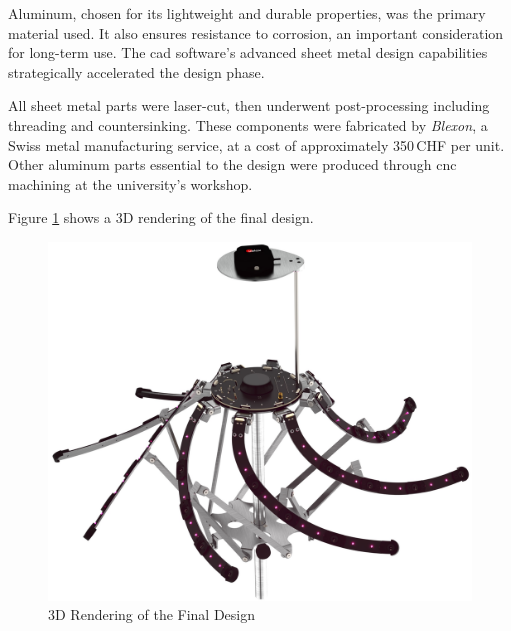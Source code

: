 Aluminum, chosen for its lightweight and durable properties, was the primary material used.
It also ensures resistance to corrosion, an important consideration for long-term use.
The \acrshort{cad} software's advanced sheet metal design capabilities strategically accelerated the design phase.

All sheet metal parts were laser-cut, then underwent post-processing including threading and countersinking.
These components were fabricated by \textit{Blexon}, a Swiss metal manufacturing service, at a cost of approximately 350\,CHF per unit.
Other aluminum parts essential to the design were produced through \acrshort{cnc} machining at the university's workshop.

Figure \ref{fig:final_design_3d_rendering} shows a 3D rendering of the final design.
\begin{figure}[h!]
	\centering
	\vspace{0.4cm}
	\includegraphics[width=1.0\textwidth]{images/6_design_final/final_design_3d_rendering.jpg}
	\caption{3D Rendering of the Final Design}
	\label{fig:final_design_3d_rendering}
\end{figure}
\pagebreak

